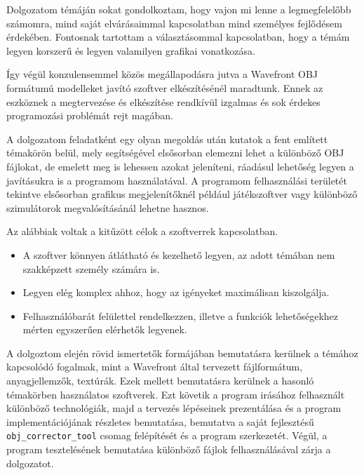 
Dolgozatom témáján sokat gondolkoztam, hogy vajon mi lenne a legmegfelelőbb számomra, mind saját elvárásaimmal kapcsolatban mind személyes fejlődésem érdekében. Fontosnak tartottam a választásommal kapcsolatban, hogy a témám legyen korszerű és legyen valamilyen grafikai vonatkozása.

Így végül konzulensemmel közös megállapodásra jutva a Wavefront OBJ formátumú modelleket javító szoftver elkészítésénél maradtunk. Ennek az eszköznek a megtervezése és elkészítése rendkívül izgalmas és sok érdekes programozási problémát rejt magában.

A dolgozatom feladatként egy olyan megoldás után kutatok a fent említett témakörön belül, mely segítségével elsősorban elemezni lehet a különböző OBJ fájlokat, de emelett meg is lehessen azokat jeleníteni, ráadásul lehetőség legyen  a javításukra is a programom használatával. A programom felhasználási területét tekintve elsősorban grafikus megjelenítőknél például játékszoftver  vagy különböző szimulátorok megvalósításánál lehetne hasznos.

Az alábbiak voltak a kitűzött célok a szoftverrek kapcsolatban.
\begin{itemize}
\item A szoftver könnyen átlátható és kezelhető legyen, az adott témában nem szakképzett
személy számára is.
\item Legyen elég komplex ahhoz, hogy  az igényeket maximálisan kiszolgálja.
\item Felhasználóbarát felülettel rendelkezzen, illetve a funkciók lehetőségekhez mérten egyszerűen elérhetők legyenek.
\end{itemize}

A dolgoztom elején rövid ismertetők formájában bemutatásra kerülnek a témához kapcsolódó fogalmak, mint a Wavefront által tervezett fájlformátum, anyagjellemzők, textúrák. Ezek mellett bemutatásra kerülnek a hasonló témakörben használatos szoftverek. Ezt követik a program irásához felhasznált különböző technológiák, majd a tervezés lépéseinek prezentálása és a program implementációjának részletes bemutatása, bemutatva a saját fejlesztésű \texttt{obj\_corrector\_tool} csomag felépítését és a program szerkezetét. Végül, a program tesztelésének bemutatása különböző fájlok felhasználásával zárja a dolgozatot.



